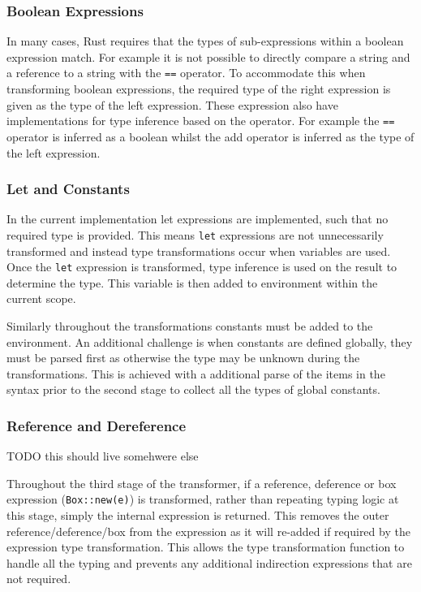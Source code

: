\documentclass[ oneside,%
                    author={James Elgar},
                    degree={MEng},
                     title={Bidirectional transformer between functional and \\ object-oriented programming in Rust},
                  subtitle={}]{dissertation}
\newcommand{\rust}[1]{\texttt{#1}}
\begin{document}
\subsubsection{Boolean Expressions}

In many cases, Rust requires that the types of sub-expressions within a boolean expression match. For example it is not possible to directly compare a string and a reference to a string with the \verb|==| operator. To accommodate this when transforming boolean expressions, the required type of the right expression is given as the type of the left expression. These expression also have implementations for type inference based on the operator. For example the \verb|==| operator is inferred as a boolean whilst the add operator is inferred as the type of the left expression.     

\subsubsection{Let and Constants}

In the current implementation let expressions are implemented, such that no required type is provided. This means \verb|let| expressions are not unnecessarily transformed and instead type transformations occur when variables are used. Once the \verb|let| expression is transformed, type inference is used on the result to determine the type. This variable is then added to environment within the current scope.

Similarly throughout the transformations constants must be added to the environment. An additional challenge is when constants are defined globally, they must be parsed first as otherwise the type may be unknown during the transformations. This is achieved with a additional parse of the items in the syntax prior to the second stage to collect all the types of global constants.

\subsubsection{Reference and Dereference}

TODO this should live somehwere else

Throughout the third stage of the transformer, if a reference, deference or box expression (\rust{Box::new(e)}) is transformed, rather than repeating typing logic at this stage, simply the internal expression is returned. This removes the outer reference/deference/box from the expression as it will re-added if required by the expression type transformation. This allows the type transformation function to handle all the typing and prevents any additional indirection expressions that are not required.
\end{document}
